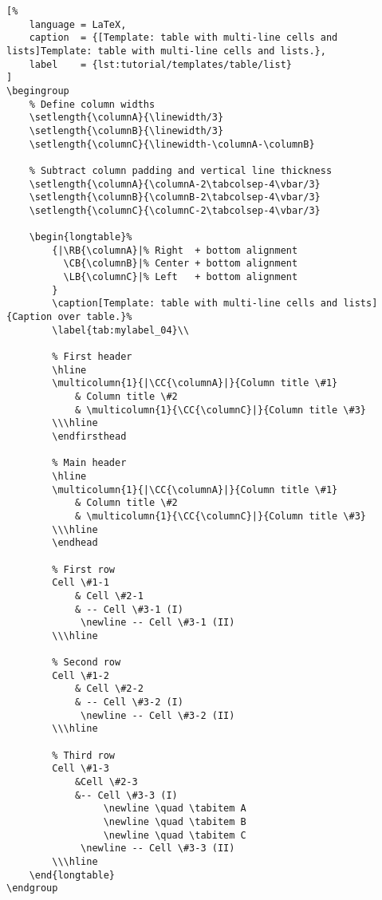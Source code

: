 \begin{lstlisting}[%
    language = LaTeX,
    caption  = {[Template: table with multi-line cells and lists]Template: table with multi-line cells and lists.},
    label    = {lst:tutorial/templates/table/list}
]
\begingroup
    % Define column widths
    \setlength{\columnA}{\linewidth/3}
    \setlength{\columnB}{\linewidth/3}
    \setlength{\columnC}{\linewidth-\columnA-\columnB}
    
    % Subtract column padding and vertical line thickness
    \setlength{\columnA}{\columnA-2\tabcolsep-4\vbar/3}
    \setlength{\columnB}{\columnB-2\tabcolsep-4\vbar/3}
    \setlength{\columnC}{\columnC-2\tabcolsep-4\vbar/3}
    
    \begin{longtable}%
        {|\RB{\columnA}|% Right  + bottom alignment
          \CB{\columnB}|% Center + bottom alignment
          \LB{\columnC}|% Left   + bottom alignment
        }
        \caption[Template: table with multi-line cells and lists]{Caption over table.}%
        \label{tab:mylabel_04}\\
        
        % First header
        \hline
        \multicolumn{1}{|\CC{\columnA}|}{Column title \#1}
            & Column title \#2
            & \multicolumn{1}{\CC{\columnC}|}{Column title \#3}
        \\\hline
        \endfirsthead
        
        % Main header
        \hline
        \multicolumn{1}{|\CC{\columnA}|}{Column title \#1}
            & Column title \#2
            & \multicolumn{1}{\CC{\columnC}|}{Column title \#3}
        \\\hline
        \endhead
        
        % First row
        Cell \#1-1
            & Cell \#2-1
            & -- Cell \#3-1 (I)
             \newline -- Cell \#3-1 (II)
        \\\hline
        
        % Second row
        Cell \#1-2
            & Cell \#2-2
            & -- Cell \#3-2 (I)
             \newline -- Cell \#3-2 (II)
        \\\hline
        
        % Third row
        Cell \#1-3
            &Cell \#2-3
            &-- Cell \#3-3 (I)
                 \newline \quad \tabitem A
                 \newline \quad \tabitem B
                 \newline \quad \tabitem C
             \newline -- Cell \#3-3 (II)
        \\\hline
    \end{longtable}
\endgroup
\end{lstlisting}